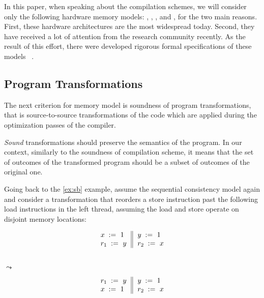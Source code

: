 In this paper, when speaking about the compilation schemes, 
we will consider only the following hardware memory models: 
\Intel, , , and \POWER, 
for the two main reasons. 
First, these hardware architectures are the 
most widespread today.
Second, they have received a lot of attention 
from the research community recently. 
As the result of this effort, 
there were developed rigorous formal 
specifications of these models~%
\cite{Sewell-al:CACM10, Sarkar-al:PLDI11, 
Flur-al:POPL16, Pulte-al:POPL18}. 

\subsection{Program Transformations}
\label{sec:background:trans}

The next criterion for memory model is 
soundness of program transformations, 
that is source-to-source transformations of 
the code which are applied during 
the optimization passes of the compiler. 

\emph{Sound} transformations should preserve the semantics 
of the program. In our context, similarly to the 
soundness of compilation scheme, it means that 
the set of outcomes of the transformed program 
should be a subset of outcomes of the original one. 

Going back to the \ref{ex:sb} example, 
assume the sequential consistency model again and
consider a transformation that reorders 
a store instruction past the following load 
instructions in the left thread, 
assuming the load and store operate on disjoint memory locations:

\begin{minipage}{0.45\linewidth}
\begin{equation*}
\inarrII{
   \writeInst{}{x}{1}   \\
   \readInst{}{r_1}{y}  \\
}{
  \writeInst{}{y}{1}   \\
  \readInst{}{r_2}{x}  \\
}
\end{equation*}
\end{minipage}\hfill%
\begin{minipage}{0.05\linewidth}
\Large~\\ $\leadsto$
\end{minipage}\hfill%
\begin{minipage}{0.45\linewidth}
\begin{equation*}
\inarrII{
   \readInst{}{r_1}{y}  \\
   \writeInst{}{x}{1}   \\
}{
  \writeInst{}{y}{1}   \\
  \readInst{}{r_2}{x}  \\
}
\end{equation*}
\end{minipage}

